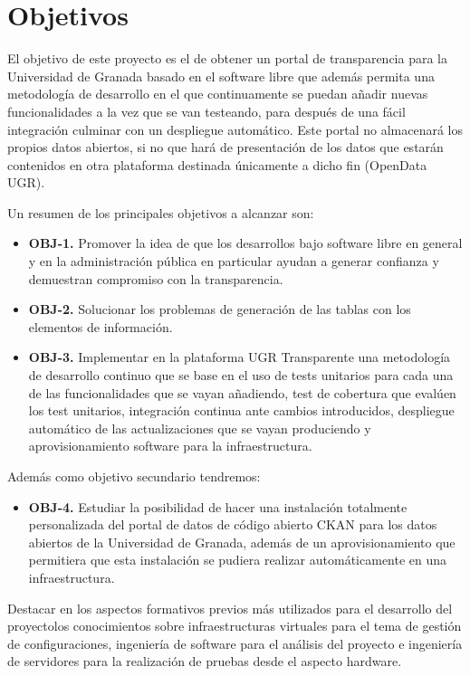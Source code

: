 \chapter{Objetivos}

El objetivo de este proyecto es el de obtener un portal de transparencia para la Universidad de Granada basado en el software 
libre que además permita una metodología de desarrollo en el que continuamente se puedan añadir nuevas funcionalidades a la 
vez que se van testeando, para después de una fácil integración culminar con un despliegue automático. Este portal no almacenará
los propios datos abiertos, si no que hará de presentación de los datos que estarán contenidos en otra plataforma destinada 
únicamente a dicho fin (OpenData UGR).

\bigskip
Un resumen de los principales objetivos a alcanzar son:

\begin{itemize}
  \item \textbf{OBJ-1.} Promover la idea de que los desarrollos bajo software libre en general y en la administración pública 
  en particular ayudan a generar confianza y demuestran compromiso con la transparencia.
  \item \textbf{OBJ-2.} Solucionar los problemas de generación de las tablas con los elementos de información.
  \item \textbf{OBJ-3.} Implementar en la plataforma UGR Transparente una metodología de desarrollo continuo que se base 
  en el uso de tests unitarios para cada una de las funcionalidades que se vayan añadiendo, test de 
  cobertura que evalúen los test unitarios, integración continua ante cambios introducidos, despliegue automático de las
  actualizaciones que se vayan produciendo y aprovisionamiento software para la infraestructura.
\end{itemize}

Además como objetivo secundario tendremos:

\begin{itemize}
  \item \textbf{OBJ-4.} Estudiar la posibilidad de hacer una instalación totalmente personalizada del portal de datos de código
  abierto CKAN para los datos abiertos de la Universidad de Granada, además de un aprovisionamiento que permitiera que esta 
  instalación se pudiera realizar automáticamente en una infraestructura.
\end{itemize}

\bigskip
Destacar en los aspectos formativos previos más utilizados para el desarrollo del proyectolos conocimientos sobre 
infraestructuras virtuales para el tema de gestión de configuraciones, ingeniería de software para el análisis del proyecto 
e ingeniería de servidores para la realización de pruebas desde el aspecto hardware.

